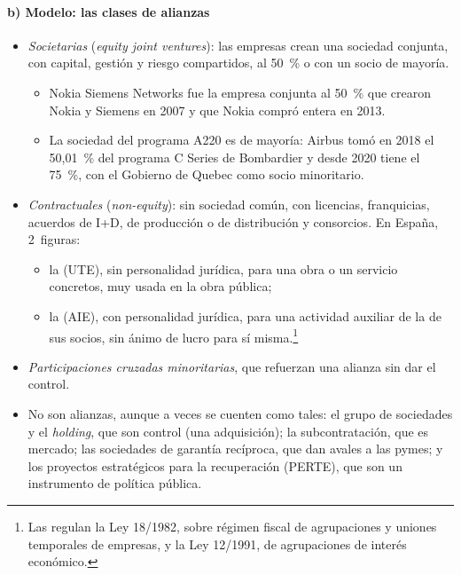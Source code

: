 \documentclass[11pt]{article}
\begin{document}
\paragraph{b) Modelo: las clases de alianzas}

\begin{itemize}
\item \emph{Societarias} (\emph{equity joint ventures}): las empresas crean una sociedad conjunta, con capital, gestión y riesgo compartidos, al 50~\% o con un socio de mayoría.
  \begin{itemize}
  \item Nokia Siemens Networks fue la empresa conjunta al 50~\% que crearon Nokia y Siemens en 2007 y que Nokia compró entera en 2013\nocite{Nokia2013NSN}.
  \item La sociedad del programa A220 es de mayoría: Airbus tomó en 2018 el 50,01~\% del programa C Series de Bombardier y desde 2020 tiene el 75~\%, con el Gobierno de Quebec como socio minoritario\nocite{Airbus2020A220}.
  \end{itemize}
\item \emph{Contractuales} (\emph{non-equity}): sin sociedad común, con licencias, franquicias, acuerdos de I+D, de producción o de distribución y consorcios. En España, 2~figuras:
  \begin{itemize}
  \item la  (UTE), sin personalidad jurídica, para una obra o un servicio concretos, muy usada en la obra pública;
  \item la  (AIE), con personalidad jurídica, para una actividad auxiliar de la de sus socios, sin ánimo de lucro para sí misma.\footnote{Las regulan la Ley 18/1982, sobre régimen fiscal de agrupaciones y uniones temporales de empresas, y la Ley 12/1991, de agrupaciones de interés económico.}
  \end{itemize}
\item \emph{Participaciones cruzadas minoritarias}, que refuerzan una alianza sin dar el control.
\item No son alianzas, aunque a veces se cuenten como tales: el grupo de sociedades y el \emph{holding}, que son control (una adquisición); la subcontratación, que es mercado; las sociedades de garantía recíproca, que dan avales a las pymes; y los proyectos estratégicos para la recuperación (PERTE), que son un instrumento de política pública.
\end{itemize}
\end{document}
